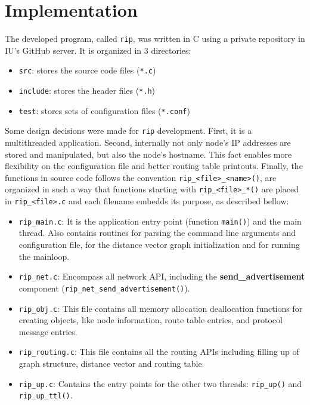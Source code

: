 \documentclass[10pt]{extarticle}
\begin{document}
\section{Implementation}

The developed program, called \texttt{rip}, was written in C using a private
repository in IU's GitHub server. It is organized in 3 directories:

\begin{itemize}
\item{\texttt{src}:} stores the source code files (\texttt{*.c})
\item{\texttt{include}:} stores the header files (\texttt{*.h})
\item{\texttt{test}:} stores sets of configuration files (\texttt{*.conf})
\end{itemize}

Some design decisions were made for \texttt{rip} development. First, it is a
multithreaded application. Second, internally not only node's IP addresses are
stored and manipulated, but also the node's hostname. This fact enables more
flexibility on the configuration file and better routing table
printouts. Finally, the functions in source code follows the convention
\texttt{rip\_<file>\_<name>()}, are organized in such a way that 
functions starting with \texttt{rip\_<file>\_*()} are placed in \texttt{rip\_<file>.c}
and each filename embedds its purpose, as described bellow:
\begin{itemize}
\item{\texttt{rip\_main.c}:} It is the application entry point (function
  \texttt{main()}) and the main thread. Also contains routines for parsing the
  command line arguments and configuration file, for the distance vector
  graph initialization and for running the mainloop. 
\item{\texttt{rip\_net.c}:} Encompass all network API, including the
  \textbf{send\_advertisement} component
  (\texttt{rip\_net\_send\_advertisement()}).
\item{\texttt{rip\_obj.c}:} This file contains all memory allocation
  deallocation functions for creating objects, like node information, route
  table entries, and protocol message entries.
\item{\texttt{rip\_routing.c}:} This file contains all the routing APIs including filling up of graph structure, distance vector and routing table.   
\item{\texttt{rip\_up.c}:} Contains the entry points for the other two threads:
  \texttt{rip\_up()} and \texttt{rip\_up\_ttl()}.
\end{itemize}
\end{document}
